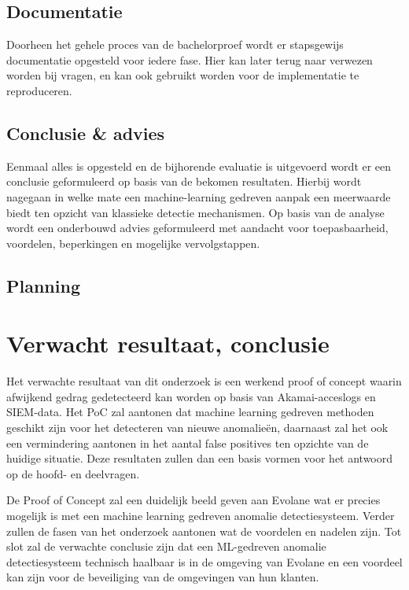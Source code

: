\subsection{Documentatie}

Doorheen het gehele proces van de bachelorproef wordt er stapsgewijs documentatie opgesteld voor iedere fase. Hier kan later terug naar verwezen worden bij vragen, en kan ook gebruikt worden voor de implementatie te reproduceren. 

\subsection{Conclusie & advies}

Eenmaal alles is opgesteld en de bijhorende evaluatie is uitgevoerd wordt er een conclusie geformuleerd op basis van de bekomen resultaten. Hierbij wordt nagegaan in welke mate een machine-learning gedreven aanpak een meerwaarde biedt ten opzicht van klassieke detectie mechanismen. Op basis van de analyse wordt een onderbouwd advies geformuleerd met aandacht voor toepasbaarheid, voordelen, beperkingen en mogelijke vervolgstappen.

\FloatBarrier
\subsection{Planning}


\section{Verwacht resultaat, conclusie}%
\label{sec:verwachte_resultaten}

Het verwachte resultaat van dit onderzoek is een werkend proof of concept waarin afwijkend gedrag gedetecteerd kan worden op basis van Akamai-acceslogs en SIEM-data. Het PoC zal aantonen dat machine learning gedreven methoden geschikt zijn voor het detecteren van nieuwe anomalieën, daarnaast zal het ook een vermindering aantonen in het aantal false positives ten opzichte van de huidige situatie. Deze resultaten zullen dan een basis vormen voor het antwoord op de hoofd- en deelvragen.

De Proof of Concept zal een duidelijk beeld geven aan Evolane wat er precies mogelijk is met een machine learning gedreven anomalie detectiesysteem. Verder zullen de fasen van het onderzoek aantonen wat de voordelen en nadelen zijn. Tot slot zal de verwachte conclusie zijn dat een ML-gedreven anomalie detectiesysteem technisch haalbaar is in de omgeving van Evolane en een voordeel kan zijn voor de beveiliging van de omgevingen van hun klanten.

